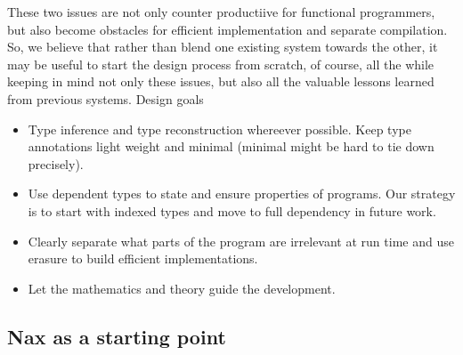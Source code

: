 These two issues are not only counter productiive for functional programmers, but also
become obstacles for efficient  implementation and separate
compilation. So, we believe that rather than blend one existing system
towards the other, it may be useful to start the design process from scratch,
of course, all the while keeping in mind not only these issues, but also
all the valuable lessons learned from previous systems. Design goals
\begin{itemize}
\item Type inference and type reconstruction whereever possible. Keep type
annotations light weight and minimal (minimal might be hard to tie down precisely).

\item Use dependent types to state and ensure properties of programs. Our strategy
is to start with indexed types and move to full dependency in future work.

\item Clearly separate what parts of the program are irrelevant at run time and
use erasure to build efficient implementations.

\item Let the mathematics and theory guide the development.
\end{itemize}

 

\subsection{Nax as a starting point}


